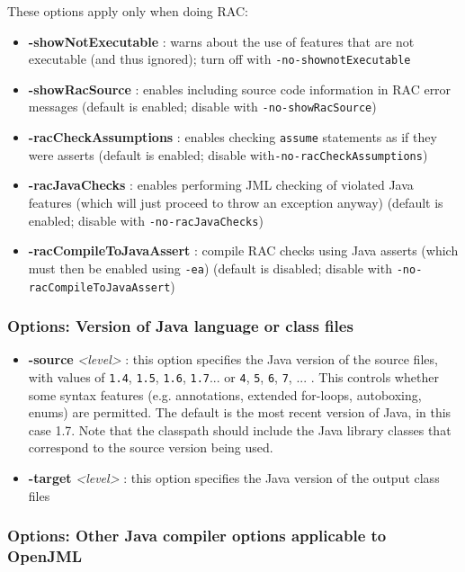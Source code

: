 These options apply only when doing RAC:
\begin{itemize}
\item \textbf{-showNotExecutable} : warns about the use of features that are not executable (and thus ignored); turn off with \texttt{-no-shownotExecutable}
\item \textbf{-showRacSource} : enables including source code information in RAC error messages (default is enabled; disable with \texttt{-no-showRacSource})
\item \textbf{-racCheckAssumptions} : enables checking \texttt{assume} statements as if they were asserts (default is enabled; disable with\texttt{-no-racCheckAssumptions})
\item \textbf{-racJavaChecks} : enables performing JML checking of violated Java features (which will just proceed to throw an exception anyway) (default is enabled; disable with \texttt{-no-racJavaChecks})
\item \textbf{-racCompileToJavaAssert} : compile RAC checks using Java asserts (which must then be enabled using \texttt{-ea}) (default is disabled; disable with \texttt{-no-racCompileToJavaAssert})
\end{itemize}

\subsubsection{Options: Version of Java language or class files}

\begin{itemize}
\item \textbf{-source} {\it <level>} : this option specifies the Java version of the source files, with values of {\tt 1.4}, {\tt 1.5}, {\tt 1.6}, {\tt 1.7}... or {\tt 4}, {\tt 5}, {\tt 6}, {\tt 7}, ... . This controls whether some syntax features  
(e.g. annotations, extended for-loops, autoboxing, enums) are permitted. The default is the most recent version
of Java, in this case 1.7.  Note that the classpath should include the Java library classes that
correspond to the source version being used.

\item \textbf{-target} {\it <level>} : this option specifies the Java version of the output class files
\end{itemize}


\subsubsection{Options: Other Java compiler options applicable to OpenJML}

